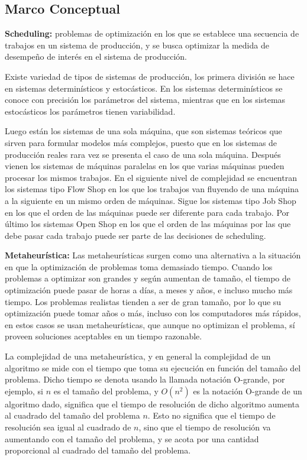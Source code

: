 \documentclass{article}
\begin{document}
\subsection{Marco Conceptual}

\indent\indent
\textbf{Scheduling:} problemas de optimización en los que se establece una secuencia de trabajos en un sistema de producción, y se busca optimizar la medida de desempeño de interés en el sistema de producción.

\vspace{\baselineskip}
Existe variedad de tipos de sistemas de producción, los primera división se hace en sistemas determinísticos y estocásticos. En los sistemas determinísticos se conoce con precisión los parámetros del sistema, mientras que en los sistemas estocásticos los parámetros tienen variabilidad. \autocite{schedPinedo}

\vspace{\baselineskip}
Luego están los sistemas de una sola máquina, que son sistemas teóricos que sirven para formular modelos más complejos, puesto que en los sistemas de producción reales rara vez se presenta el caso de una sola máquina. Después vienen los sistemas de máquinas paralelas en los que varias máquinas pueden procesar los mismos trabajos. En el siguiente nivel de complejidad se encuentran los sistemas tipo Flow Shop en los que los trabajos van fluyendo de una máquina a la siguiente en un mismo orden de máquinas. Sigue los sistemas tipo Job Shop en los que el orden de las máquinas puede ser diferente para cada trabajo. Por último los sistemas Open Shop en los que el orden de las máquinas por las que debe pasar cada trabajo puede ser parte de las decisiones de scheduling. \autocite{schedPinedo}

\vspace{\baselineskip}
\textbf{Metaheurística:} Las metaheurísticas surgen como una alternativa a la \linebreak situación en que la optimización de problemas toma demasiado tiempo. Cuando los problemas a optimizar son grandes y según aumentan de tamaño, el tiempo de optimización puede pasar de horas a días, a meses y años, e incluso mucho más tiempo. Los problemas realistas tienden a ser de gran tamaño, por lo que su optimización puede tomar años o más, incluso con los computadores más rápidos, en estos casos se usan metaheurísticas, que aunque no optimizan el problema, sí proveen soluciones aceptables en un tiempo razonable. \autocite{metaTalbi}

\vspace{\baselineskip}
La complejidad de una metaheurística, y en general la complejidad de un algoritmo se mide con el tiempo que toma su ejecución en función del tamaño del problema. Dicho tiempo se denota usando la llamada notación O-grande, por ejemplo, si $n$ es el tamaño del problema, y $O(n^2)$ es la notación O-grande de un algoritmo dado, significa que el tiempo de resolución de dicho algoritmo aumenta al cuadrado del tamaño del problema $n$. Esto no significa que el tiempo de resolución sea igual al cuadrado de $n$, sino que el tiempo de resolución va aumentando con el tamaño del problema, y se acota por una cantidad proporcional al cuadrado del tamaño del problema. \autocite{metaTalbi}
\end{document}
